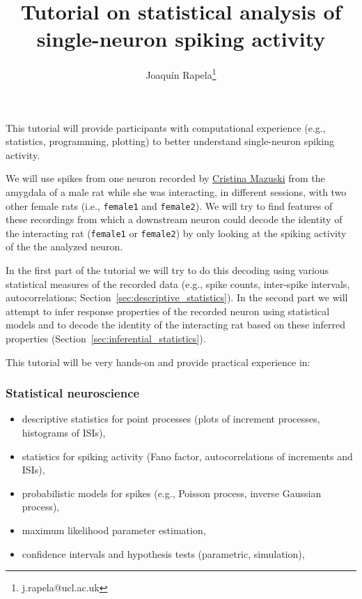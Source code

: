 \documentclass[10pt]{article}
\title{Tutorial on statistical analysis of single-neuron spiking activity}
\author{Joaqu\'{i}n Rapela\thanks{j.rapela@ucl.ac.uk}}
\begin{document}
\maketitle

This tutorial will provide participants with computational experience
(e.g., statistics, programming, plotting) to better understand single-neuron
spiking activity.

We will use spikes from one neuron recorded by \href{https://www.sainsburywellcome.org/web/people/cristina-mazuski}{Cristina Mazuski} from the
amygdala of a male rat while she was interacting, in different sessions,
with two other female rats (i.e., \texttt{female1} and \texttt{female2}). We will try to find
features of these recordings from which a downstream neuron could decode the
identity of the interacting rat (\texttt{female1} or \texttt{female2}) by only looking at the
spiking activity of the the analyzed neuron.

In the first part of the tutorial we will try to do this decoding using various
statistical measures of the recorded data (e.g., spike counts, inter-spike
intervals, autocorrelations; Section~\ref{sec:descriptive_statistics}). In the
second part we will attempt to infer response properties of the recorded neuron
using statistical models and to decode the identity of the interacting rat
based on these inferred properties (Section~\ref{sec:inferential_statistics}).

This tutorial will be very hands-on and provide practical experience in:

\subsubsection*{Statistical neuroscience}

        \begin{itemize}
            \item descriptive statistics for point processes (plots of increment processes, histograms of ISIs),
            \item statistics for spiking activity (Fano factor, autocorrelations of increments and ISIs),
            \item probabilistic models for spikes (e.g., Poisson process, inverse Gaussian process),
            \item maximum likelihood parameter estimation,
            \item confidence intervals and hypothesis tests (parametric, simulation),
        \end{itemize}
\end{document}
